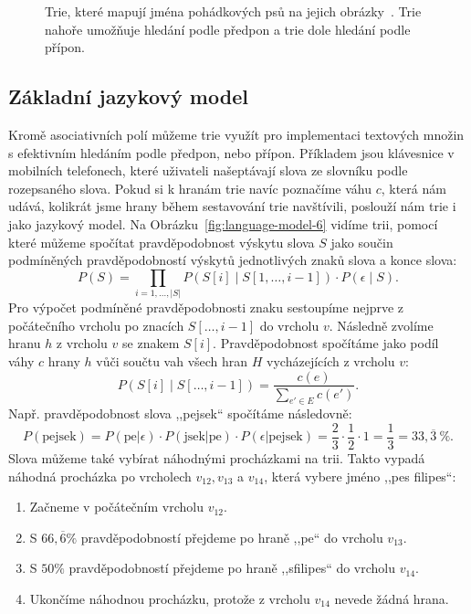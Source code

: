 \documentclass{csbulletin}
\begin{document}
\begin{figure}
\centering

\caption{Trie, které mapují jména pohádkových psů na jejich obrázky~\cite{hannabarbera2023huckleberry, capek1972povidani, gogen2023gogen}. Trie nahoře umožňuje hledání podle předpon a trie dole hledání podle přípon.}
\label{fig:trie}
\bigskip

\end{figure}

\subsection{Základní jazykový model}
Kromě asociativních polí můžeme trie využít pro implementaci textových množin s efektivním hledáním podle předpon, nebo přípon. Příkladem jsou klávesnice v mobilních telefonech, které uživateli našeptávají slova ze slovníku podle rozepsaného slova. Pokud si k hranám trie navíc poznačíme váhu $c$, která nám udává, kolikrát jsme hrany během sestavování trie navštívili, poslouží nám trie i jako jazykový model. Na Obrázku~\ref{fig:language-model-6} vidíme trii, pomocí které můžeme spočítat pravděpodobnost výskytu slova $S$ jako součin podmíněných pravděpodobností výskytů jednotlivých znaků slova a konce slova:
\begin{equation}
P(S) = \prod_{i = 1,\ldots,|S|} P(S[i]\mid S[1, \ldots, i-1])\cdot P(\epsilon\mid S).
\end{equation}
Pro výpočet podmíněné pravděpodobnosti znaku sestoupíme nejprve z počátečního vrcholu po znacích $S[\ldots, i-1]$ do vrcholu $v$. Následně zvolíme hranu $h$ z vrcholu $v$ se znakem $S[i]$. Pravděpodobnost spočítáme jako podíl váhy $c$ hrany $h$ vůči součtu vah všech hran $H$ vycházejících z vrcholu $v$:
\begin{equation}
P(S[i]\mid S[\ldots, i-1]) = \frac{c(e)}{\sum_{e'\in E} c(e')}.
\end{equation}
Např. pravděpodobnost slova ,,pejsek`` spočítáme následovně:
\begin{equation}
P(\text{pejsek}) = P(\text{pe}|\epsilon) \cdot P(\text{jsek}|\text{pe}) \cdot P(\epsilon|\text{pejsek}) = \frac23\cdot \frac12\cdot 1 = \frac13 = 33{,}\overline3\ \%.
\end{equation}
Slova můžeme také vybírat náhodnými procházkami na trii. Takto vypadá náhodná procházka po vrcholech $v_{12}, v_{13}$ a $v_{14}$, která vybere jméno ,,pes filipes``:
\begin{enumerate}
\item Začneme v počátečním vrcholu $v_{12}$.
\item S $66{,}\overline6\%$ pravděpodobností přejdeme po hraně ,,pe`` do vrcholu $v_{13}$.
\item S $50\%$ pravděpodobností přejdeme po hraně ,,s\textvisiblespace filipes`` do vrcholu $v_{14}$.
\item Ukončíme náhodnou procházku, protože z vrcholu $v_{14}$ nevede žádná hrana.
\end{enumerate}
\end{document}
